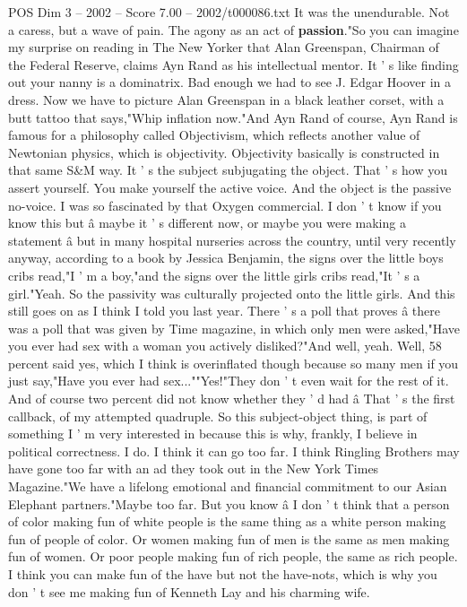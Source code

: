 \begin{textsample}{POS Dim 3 – 2002 – Score 7.00 – 2002/t000086.txt}
It was the unendurable.
Not a caress, but a wave of pain.
The agony as an act of \textbf{passion}."So you can imagine my surprise on reading in The New Yorker that Alan Greenspan, Chairman of the Federal Reserve, claims Ayn Rand as his intellectual mentor.
It ' s like finding out your nanny is a dominatrix.
Bad enough we had to see J.
Edgar Hoover in a dress.
Now we have to picture Alan Greenspan in a black leather corset, with a butt tattoo that says,"Whip inflation now."And Ayn Rand of course, Ayn Rand is famous for a philosophy called Objectivism, which reflects another value of Newtonian physics, which is objectivity.
Objectivity basically is constructed in that same S\&M way.
It ' s the subject subjugating the object.
That ' s how you assert yourself.
You make yourself the active voice.
And the object is the passive no-voice.
I was so fascinated by that Oxygen commercial.
I don ' t know if you know this but â maybe it ' s different now, or maybe you were making a statement â but in many hospital nurseries across the country, until very recently anyway, according to a book by Jessica Benjamin, the signs over the little boys cribs read,"I ' m a boy,"and the signs over the little girls cribs read,"It ' s a girl."Yeah.
So the passivity was culturally projected onto the little girls.
And this still goes on as I think I told you last year.
There ' s a poll that proves â there was a poll that was given by Time magazine, in which only men were asked,"Have you ever had sex with a woman you actively disliked?"And well, yeah.
Well, 58 percent said yes, which I think is overinflated though because so many men if you just say,"Have you ever had sex...""Yes!"They don ' t even wait for the rest of it.
And of course two percent did not know whether they ' d had â That ' s the first callback, of my attempted quadruple.
So this subject-object thing, is part of something I ' m very interested in because this is why, frankly, I believe in political correctness.
I do.
I think it can go too far.
I think Ringling Brothers may have gone too far with an ad they took out in the New York Times Magazine."We have a lifelong emotional and financial commitment to our Asian Elephant partners."Maybe too far.
But you know â I don ' t think that a person of color making fun of white people is the same thing as a white person making fun of people of color.
Or women making fun of men is the same as men making fun of women.
Or poor people making fun of rich people, the same as rich people.
I think you can make fun of the have but not the have-nots, which is why you don ' t see me making fun of Kenneth Lay and his charming wife.

\end{textsample}
